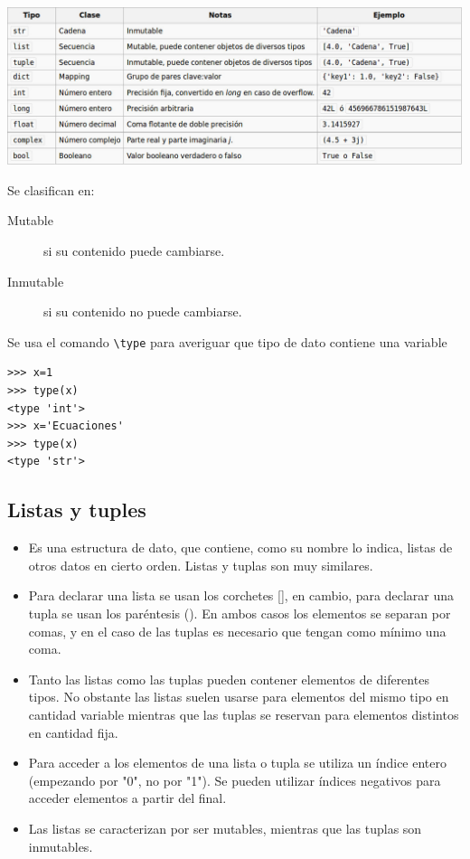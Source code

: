 \includegraphics[scale=.4]{imagenes/tipo_datos.jpg}

Se clasifican en:
\begin{description}
 \item[Mutable] si su contenido puede cambiarse.
 \item[Inmutable] si su contenido no puede cambiarse.
\end{description}

Se usa el comando \verb~\type~ para averiguar que tipo de dato contiene una variable

 \begin{lstlisting}
>>> x=1
>>> type(x)
<type 'int'>
>>> x='Ecuaciones'
>>> type(x)
<type 'str'>
\end{lstlisting}





\subsection{Listas y tuples}


\begin{itemize}

\item Es una estructura de dato, que contiene, como su nombre lo indica, listas de otros datos en cierto orden. Listas y tuplas son muy similares.

\item Para declarar una lista se usan los corchetes [], en cambio, para declarar una tupla se usan los paréntesis (). En ambos casos los elementos se separan por comas, y en el caso de las tuplas es necesario que tengan como mínimo una coma.

\item    Tanto las listas como las tuplas pueden contener elementos de diferentes tipos. No obstante las listas suelen usarse para elementos del mismo tipo en cantidad variable mientras que las tuplas se reservan para elementos distintos en cantidad fija.
    
\item Para acceder a los elementos de una lista o tupla se utiliza un índice entero (empezando por "0", no por "1"). Se pueden utilizar índices negativos para acceder elementos a partir del final.


\item Las listas se caracterizan por ser mutables, mientras que las tuplas son inmutables.

\end{itemize}






